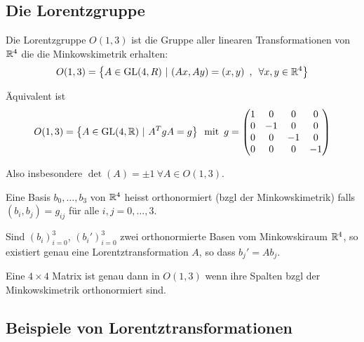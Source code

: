 \subsection{Die Lorentzgruppe}

Die Lorentzgruppe $O(1,3)$ ist die Gruppe aller linearen Transformationen von
$\mathbb{R}^4$ die die Minkowskimetrik erhalten:
\begin{align*}
    O(1,3) = \left\{ A \in \text{GL}(4,R) \ | \ (A x , A y) = (x,y)
    \hspace{5pt} , \hspace{5pt} \forall x,y \in \mathbb{R}^4 \right\}
\end{align*}

Äquivalent ist
\begin{align*}
    O(1,3) = \left\{ A \in \text{GL}(4,\mathbb{R}) \ | \ A^T g A = g \right\}
    \hspace{5pt} \text{mit} \hspace{5pt}
    g = \begin{pmatrix}
        1 & 0 & 0 & 0 \\
        0 & -1 & 0 & 0 \\
        0 & 0 & -1 & 0 \\
        0 & 0 & 0 & -1
    \end{pmatrix}
\end{align*}

Also insbesondere $\det(A) = \pm 1 \ \forall A \in O(1,3)$.

\begin{definition}
    Eine Basis $b_0,\dots,b_3$ von $\mathbb{R}^4$ heisst orthonormiert (bzgl der
    Minkowskimetrik) falls $(b_i,b_j) = g_{ij}$ für alle $i,j = 0,\dots,3$.
\end{definition}

\begin{satz}
    Sind $(b_i)_{i=0}^3$, $(b_i')_{i=0}^3$ zwei orthonormierte Basen vom
    Minkowskiraum $\mathbb{R}^4$, so existiert genau eine Lorentztransformation 
    $A$, so dass $b_j' = A b_j$.
\end{satz}

\begin{korollar}
    Eine $4 \times 4$ Matrix ist genau dann in $O(1,3)$ wenn ihre Spalten
    bzgl der Minkowskimetrik orthonormiert sind.
\end{korollar}

\subsection{Beispiele von Lorentztransformationen}

